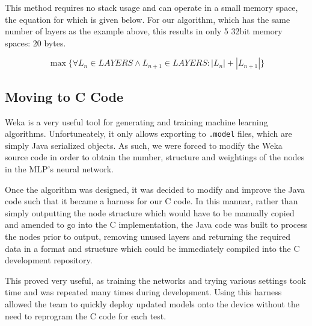 This method requires no stack usage and can operate in a small memory space, the equation for which is given below. For our algorithm, which has the same number of layers as the example above, this results in only 5 32bit memory spaces: 20 bytes.

\begin{equation}
\label{eq:algo-size}
\max\{\forall L_n \in LAYERS \wedge L_{n+1} \in LAYERS : |L_n|+|L_{n+1}|\}
\end{equation}

\subsection{Moving to C Code}

Weka is a very useful tool for generating and training machine learning algorithms. Unfortuneately, it only allows exporting to \verb|.model| files, which are simply Java serialized objects. As such, we were forced to modify the Weka source code in order to obtain the number, structure and weightings of the nodes in the MLP's neural network.

Once the algorithm was designed, it was decided to modify and improve the Java code such that it became a harness for our C code. In this mannar, rather than simply outputting the node structure which would have to be manually copied and amended to go into the C implementation, the Java code was built to process the nodes prior to output, removing unused layers and returning the required data in a format and structure which could be immediately compiled into the C development repository.

This proved very useful, as training the networks and trying various settings took time and was repeated many times during development. Using this harness allowed the team to quickly deploy updated models onto the device without the need to reprogram the C code for each test.
